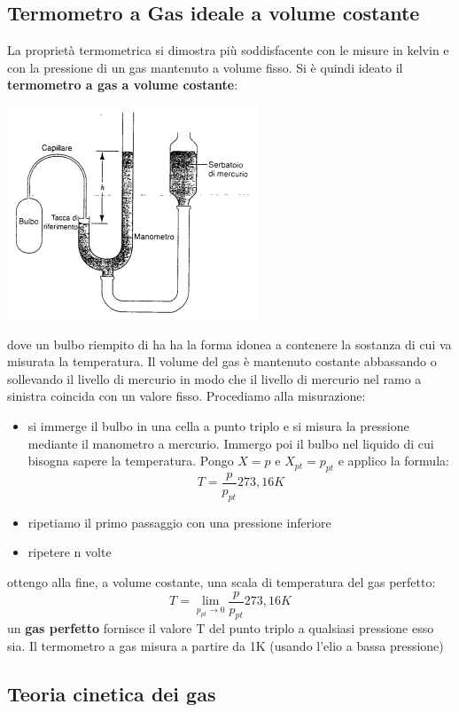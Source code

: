 \documentclass[a4paper,12pt, oneside]{book}
\begin{document}
\subsection{Termometro a Gas ideale a volume costante}
La proprietà termometrica si dimostra più soddisfacente con le misure in kelvin e con la pressione di un gas mantenuto a volume fisso. Si è quindi ideato il \textbf{termometro a gas a volume costante}:
\begin{center}
	\includegraphics[scale=0.5]{img/term.png}
\end{center}
dove un bulbo riempito di ha ha la forma idonea a contenere la sostanza di cui va misurata la temperatura. Il volume del gas è mantenuto costante abbassando o sollevando il livello di mercurio in modo che il livello di mercurio nel ramo a sinistra coincida con un valore fisso. Procediamo alla misurazione:
\begin{itemize}
	\item si immerge il bulbo in una cella a punto triplo e si misura la pressione mediante il manometro a mercurio. Immergo poi il bulbo nel liquido di cui bisogna sapere la temperatura. Pongo $X=p$ e $X_{pt}=p_{pt}$ e applico la formula:
	      $$T=\frac{p}{p_{pt}}273,16K$$
	\item ripetiamo il primo passaggio con una pressione inferiore
	\item ripetere n volte
\end{itemize}
ottengo alla fine, a volume costante, una scala di temperatura del gas perfetto:
$$T=\lim_{p_{pt}\to 0}\frac{p}{p_{pt}}273,16K$$
un \textbf{gas perfetto} fornisce il valore T del punto triplo a qualsiasi pressione esso sia. Il termometro a gas misura a partire da 1K (usando l'elio a bassa pressione)
\subsection{Teoria cinetica dei gas}
\end{document}
